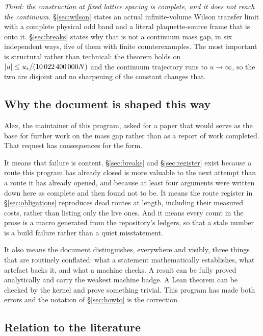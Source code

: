 \emph{Third: the construction at fixed lattice spacing is complete, and
it does not reach the continuum.} \S\ref{sec:wilson} states an actual
infinite-volume Wilson transfer limit with a complete physical odd band
and a literal plaquette-source frame that is onto it. \S\ref{sec:breaks}
states why that is not a continuum mass gap, in six independent ways,
five of them with finite counterexamples. The most important is
structural rather than technical: the theorem holds on
$\left\lvert u \right\rvert \le u_*/(10\,022\,400\,000 N)$ and the continuum trajectory runs
to $u \to \infty$, so the two are disjoint and no sharpening of the
constant changes that.

\subsection{Why the document is shaped this way}

Alex, the maintainer of this program, asked for a paper that would serve
as the base for further work on the mass gap rather than as a report of
work completed. That request has consequences for the form.

It means that failure is content. \S\ref{sec:breaks} and
\S\ref{sec:register} exist because a route this program has already
closed is more valuable to the next attempt than a route it has already
opened, and because at least four arguments were written down here as
complete and then found not to be. It means the route register in
\S\ref{sec:obligations} reproduces \RouteDead{} dead routes at length,
including their measured costs, rather than listing only the \RouteLive{}
live ones. And it means every count in the prose is a macro generated
from the repository's ledgers, so that a stale number is a build failure
rather than a quiet misstatement.

It also means the document distinguishes, everywhere and visibly, three
things that are routinely conflated: what a statement mathematically
establishes, what artefact backs it, and what a machine checks. A result
can be fully proved analytically and carry the weakest machine badge.
A Lean theorem can be checked by the kernel and prove something
trivial. This program has made both errors and the notation of
\S\ref{sec:howto} is the correction.

\subsection{Relation to the literature}

